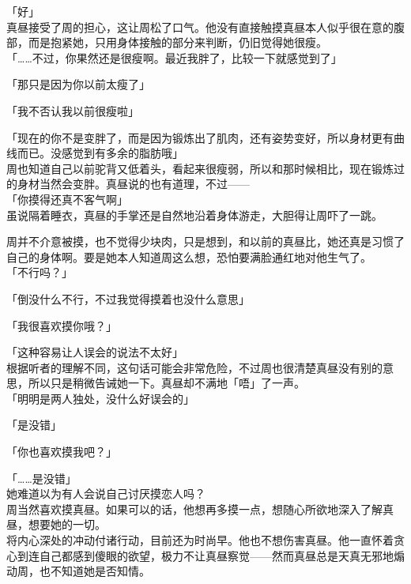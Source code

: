 「好」\\

真昼接受了周的担心，这让周松了口气。他没有直接触摸真昼本人似乎很在意的腹部，而是抱紧她，只用身体接触的部分来判断，仍旧觉得她很瘦。\\

「……不过，你果然还是很瘦啊。最近我胖了，比较一下就感觉到了」

「那只是因为你以前太瘦了」

「我不否认我以前很瘦啦」

「现在的你不是变胖了，而是因为锻炼出了肌肉，还有姿势变好，所以身材更有曲线而已。没感觉到有多余的脂肪哦」\\

周也知道自己以前驼背又低着头，看起来很瘦弱，所以和那时候相比，现在锻炼过的身材当然会变胖。真昼说的也有道理，不过——\\

「你摸得还真不客气啊」\\

虽说隔着睡衣，真昼的手掌还是自然地沿着身体游走，大胆得让周吓了一跳。

周并不介意被摸，也不觉得少块肉，只是想到，和以前的真昼比，她还真是习惯了自己的身体啊。要是她本人知道周这么想，恐怕要满脸通红地对他生气了。\\

「不行吗？」

「倒没什么不行，不过我觉得摸着也没什么意思」

「我很喜欢摸你哦？」

「这种容易让人误会的说法不太好」\\

根据听者的理解不同，这句话可能会非常危险，不过周也很清楚真昼没有别的意思，所以只是稍微告诫她一下。真昼却不满地「唔」了一声。\\

「明明是两人独处，没什么好误会的」

「是没错」

「你也喜欢摸我吧？」

「……是没错」\\

她难道以为有人会说自己讨厌摸恋人吗？\\

周当然喜欢摸真昼。如果可以的话，他想再多摸一点，想随心所欲地深入了解真昼，想要她的一切。\\

将内心深处的冲动付诸行动，目前还为时尚早。他也不想伤害真昼。他一直怀着贪心到连自己都感到傻眼的欲望，极力不让真昼察觉——然而真昼总是天真无邪地煽动周，也不知道她是否知情。\\

